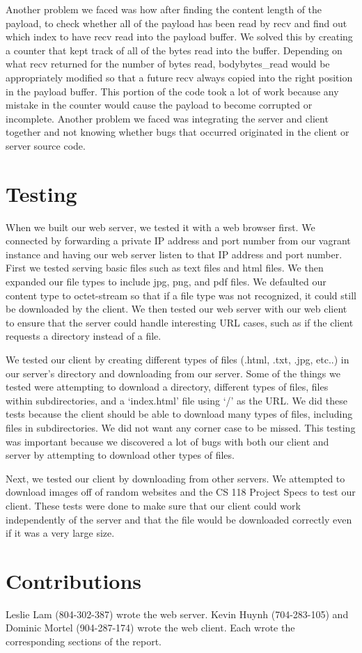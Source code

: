 \documentclass{article}
\begin{document}
    Another problem we faced was how after finding the content length of the
    payload, to check whether all of the payload has been read by recv and find
    out which index to have recv read into the payload buffer. We solved this
    by creating a counter that kept track of all of the bytes read into the
    buffer. Depending on what recv returned for the number of bytes read,
    bodybytes\_read would be appropriately modified so that a future recv
    always copied into the right position in the payload buffer. This portion
    of the code took a lot of work because any mistake in the counter would
    cause the payload to become corrupted or incomplete. Another problem we
    faced was integrating the server and client together and not knowing
    whether bugs that occurred originated in the client or server source code.

\section{Testing}
    When we built our web server, we tested it with a web browser first. We
    connected by forwarding a private IP address and port number from our
    vagrant instance and having our web server listen to that IP address and
    port number. First we tested serving basic files such as text files and
    html files. We then expanded our file types to include jpg, png, and pdf
    files. We defaulted our content type to octet-stream so that if a file type
    was not recognized, it could still be downloaded by the client. We then
    tested our web server with our web client to ensure that the server could
    handle interesting URL cases, such as if the client requests a directory
    instead of a file.
    
    We tested our client by creating different types of files (.html, .txt,
    .jpg, etc..)  in our server's directory and downloading from our server.
    Some of the things we tested were attempting to download a directory,
    different types of files, files within subdirectories, and a `index.html'
    file using `/' as the URL. We did these tests because the client should be
    able to download many types of files, including files in subdirectories. We
    did not want any corner case to be missed. This testing was important
    because we discovered a lot of bugs with both our client and server by
    attempting to download other types of files.

    Next, we tested our client by downloading from other servers. We attempted
    to download images off of random websites and the CS 118 Project Specs to
    test our client. These tests were done to make sure that our client could
    work independently of the server and that the file would be downloaded
    correctly even if it was a very large size.

\section{Contributions}
    Leslie Lam (804-302-387) wrote the web server. Kevin Huynh (704-283-105)
    and Dominic Mortel (904-287-174) wrote the web client. Each wrote the
    corresponding sections of the report.
\end{document}
